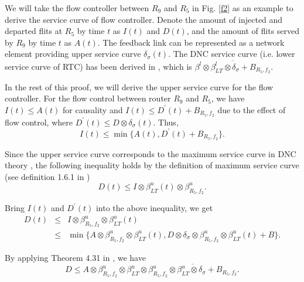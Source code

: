 \documentclass[preprint]{elsarticle}
\begin{document}
\begin{pf}
We will take the flow controller between $R_9$ and $R_5$ in Fig. \ref{f2} as an example to derive the service curve of flow controller. Denote the amount of injected and departed flits at $R_5$ by time $t$ as $I(t)$ and $D(t)$, and the amount of flits served by $R_9$ by time $t$ as $A(t)$. The feedback link can be represented as a network element providing upper service curve $\delta_\sigma(t)$. The DNC service curve (i.e. lower service curve of RTC) has been derived in \cite{qian2009analysis}, which is $\overline{\beta^l\otimes\beta_{LT}^l\otimes\delta_{\sigma}+B_{R_5,f_2}}$.

In the rest of this proof, we will derive the upper service curve for the flow controller. For the flow control between router $R_9$ and $R_5$, we have $I(t)\leq A(t)$ for causality and $I(t)\leq D^\prime(t)+B_{R_5,f_2}$ due to the effect of flow control, where $D^\prime(t)\leq D\otimes\delta_\sigma(t)$. Thus, $$I(t)\leq\min\{A(t),D^\prime(t)+B_{R_5,f_2}\}.$$

Since the upper service curve corresponds to the maximum service curve in DNC theory \cite{Boudec2001Network}, the following inequality holds by the definition of maximum service curve (see definition 1.6.1 in \cite{Boudec2001Network})
$$D(t)\leq I\otimes \beta_{LT}^u(t)\otimes\beta_{R_5,f_2}^u.$$

Bring $I(t)$ and $D^\prime(t)$ into the above inequality, we get
\begin{eqnarray*}
D(t)&\leq& I\otimes \beta_{R_5,f_2}^u\otimes\beta_{LT}^u(t)\\
&\leq& \min\{A\otimes \beta^u_{R_5,f_2}\otimes\beta_{LT}^u(t),D\otimes\delta_\sigma\otimes \beta_{R_5,f_2}^u\otimes\beta_{LT}^u(t)+B\}.
\end{eqnarray*}

By applying Theorem 4.31 in \cite{Boudec2001Network}, we have
$$D\leq A\otimes \beta^u_{R_5,f_2}\otimes\beta_{LT}^u\otimes\overline{\beta_{R_5,f_2}^u\otimes\beta_{LT}^u\otimes\delta_\sigma+B_{R_5,f_2}}.$$


\end{pf}
\end{document}
